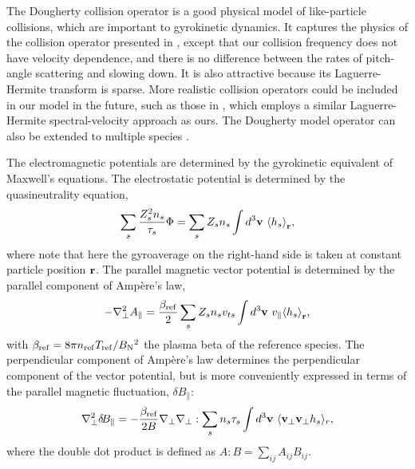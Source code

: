 \documentclass{jpp}
\renewcommand{\vec}[1]{\ensuremath{\mbox{$ {\bf #1} $}}} %
\begin{document}
The Dougherty collision operator is a good physical model of like-particle
collisions, which are important to gyrokinetic dynamics.  It captures
the physics of the collision operator presented in \cite{Abel2008},
except that our collision frequency does not have velocity
dependence, and there is no difference between the rates of pitch-angle scattering and slowing down.
It is also attractive because its Laguerre-Hermite transform is sparse.
More realistic collision operators could be included in our model in the future, such as those in \cite{Frei2021,Frei2022a}, which employs a similar Laguerre-Hermite spectral-velocity approach as ours. The Dougherty model operator can also be extended to multiple species \citep{Francisquez2022}.
    
The electromagnetic potentials are determined by the gyrokinetic equivalent of Maxwell's equations. The electrostatic potential is determined by the quasineutrality equation,
\begin{equation}
\sum_s \frac{ Z_s^2 n_s}{\tau_s} \Phi = \sum_s Z_s n_s \int d^3{\bf v}\ \langle{ h_s \rangle}_{\bf r}, \label{qneuts}
\end{equation}
where note that here the gyroaverage on the right-hand side is taken at constant particle position $\vec{r}$.
The parallel magnetic vector potential is determined by  the parallel component of Amp\`ere's law,
\begin{equation}
     -\nabla_\perp^2 A_\parallel =\frac{\beta_\mathrm{ref}}{2}\sum_s Z_s n_s v_{ts}  \int d^3{\bf v}\ v_\parallel  \langle{ h_s \rangle}_{\bf r}, \label{ampere}
\end{equation}
with $\beta_\mathrm{ref} = 8\pi n_\mathrm{ref} T_\mathrm{ref}/B_{\color{black}\mathrm{N}}^2$ the plasma beta of the reference species. The perpendicular component of Amp\`ere's law determines the perpendicular component of the vector potential, but is more conveniently expressed in terms of the parallel magnetic fluctuation, $\delta\! B_\parallel$:
\begin{gather}
     \nabla_\perp^2 \delta\! B_\parallel = -\frac{\beta_\mathrm{ref}}{2 {\color{black} B}}\nabla_\perp\nabla_\perp : \sum_s n_s \tau_s \int d^3\vec{v}\ \langle \vec{v}_\perp \vec{v}_\perp h_s\rangle_r, \label{dB}
\end{gather}
{\color{black} where the double dot product is defined as $A : B = \sum_{ij} A_{ij} B_{ij}$}.
\end{document}
